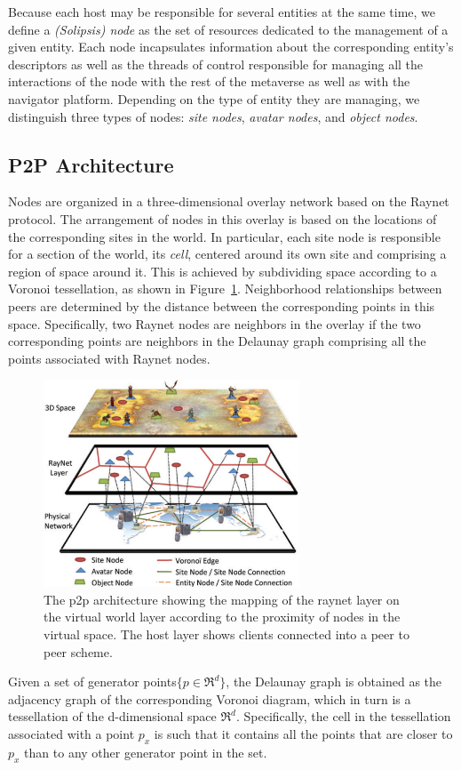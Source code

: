 Because each host may be responsible for several entities at the same
time, we define a \emph{(Solipsis) node} as the set of resources
dedicated to the management of a given entity. Each node incapsulates
information about the corresponding entity's descriptors as well as
the threads of control responsible for managing all the interactions
of the node with the rest of the \sol metaverse as well as with the
navigator platform. Depending on the type of entity they are managing,
we distinguish three types of \sol nodes: \emph{site nodes},
\emph{avatar nodes}, and \emph{object nodes}. 




\subsection{P2P Architecture}
Nodes are organized in a three-dimensional overlay network based on
the Raynet protocol. The arrangement of nodes in this overlay is based
on the locations of the corresponding sites in the \sol world. In
particular, each site node is responsible for a section of the world,
its \emph{cell}, centered around its own site and comprising a region
of space around it. This is achieved by subdividing space according to
a Voronoi tessellation, as shown in
Figure~\ref{Fig:Overview}. Neighborhood relationships between peers
are determined by the distance between the corresponding points in
this space. Specifically, two Raynet nodes are neighbors in the
overlay if the two corresponding points are neighbors in the Delaunay
graph comprising all the points associated with Raynet nodes.

\begin{figure}
\center
\includegraphics[width=3in]{figs/overview.pdf}
\caption{The p2p architecture showing the mapping of the raynet layer on the virtual world layer according to the proximity of nodes in the virtual space. The host layer shows clients connected into a peer to peer scheme.}
\label{Fig:Overview}
\end{figure}

Given a set of generator points$\{p \in \Re^d\}$, the Delaunay graph
is obtained as the adjacency graph of the corresponding Voronoi
diagram, which in turn is a tessellation of the d-dimensional space
$\Re^d$. Specifically, the cell in the tessellation associated with a
point $p_x$ is such that it contains all the points that are closer to
$p_x$ than to any other generator point in the set.







